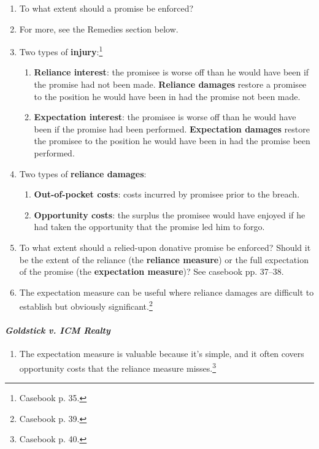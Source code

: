 \begin{enumerate}
    \item To what extent should a promise be enforced?
    \item For more, see the Remedies section below.
    \item Two types of \textbf{injury}:\footnote{Casebook p. 35.}
    \begin{enumerate}
        \item \textbf{Reliance interest}: the promisee is worse off than he 
        would have been if the promise had not been made. \textbf{Reliance 
        damages} restore a promisee to the position he would have been in had 
        the promise not been made.
        \item \textbf{Expectation interest}: the promisee is worse off than he 
        would have been if the promise had been performed. \textbf{Expectation 
        damages} restore the promisee to the position he would have been in 
        had the promise been performed.
    \end{enumerate}
    \item Two types of \textbf{reliance damages}:
    \begin{enumerate}
        \item \textbf{Out-of-pocket costs}: costs incurred by promisee prior 
        to the breach.
        \item \textbf{Opportunity costs}: the surplus the promisee would have 
        enjoyed if he had taken the opportunity that the promise led him to 
        forgo.
    \end{enumerate}
    \item To what extent should a relied-upon donative promise be enforced? 
    Should it be the extent of the reliance (the \textbf{reliance measure}) or 
    the full expectation of the promise (the \textbf{expectation measure})? See 
    casebook pp. 37--38.
    \item The expectation measure can be useful where reliance damages are 
    difficult to establish but obviously significant.\footnote{Casebook p. 39.}
\end{enumerate}

\paragraph{\emph{Goldstick v. ICM Realty}}

\begin{enumerate}
    \item The expectation measure is valuable because it's simple, and it 
    often covers opportunity costs that the reliance measure 
    misses.\footnote{Casebook p. 40.}
\end{enumerate}

